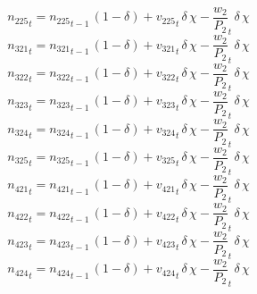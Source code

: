 \begin{dmath}
{{n_{225}}}_{t}={{n_{225}}}_{t-1}\, \left(1-{{\delta}}\right)+{{v_{225}}}_{t}\, {{\delta}}\, {{\chi}}-{{\frac{w_{2}}{P_{2}}}}_{t}\, {{\delta}}\, {{\chi}}
\end{dmath}
\begin{dmath}
{{n_{321}}}_{t}={{n_{321}}}_{t-1}\, \left(1-{{\delta}}\right)+{{v_{321}}}_{t}\, {{\delta}}\, {{\chi}}-{{\frac{w_{2}}{P_{2}}}}_{t}\, {{\delta}}\, {{\chi}}
\end{dmath}
\begin{dmath}
{{n_{322}}}_{t}={{n_{322}}}_{t-1}\, \left(1-{{\delta}}\right)+{{v_{322}}}_{t}\, {{\delta}}\, {{\chi}}-{{\frac{w_{2}}{P_{2}}}}_{t}\, {{\delta}}\, {{\chi}}
\end{dmath}
\begin{dmath}
{{n_{323}}}_{t}={{n_{323}}}_{t-1}\, \left(1-{{\delta}}\right)+{{v_{323}}}_{t}\, {{\delta}}\, {{\chi}}-{{\frac{w_{2}}{P_{2}}}}_{t}\, {{\delta}}\, {{\chi}}
\end{dmath}
\begin{dmath}
{{n_{324}}}_{t}={{n_{324}}}_{t-1}\, \left(1-{{\delta}}\right)+{{v_{324}}}_{t}\, {{\delta}}\, {{\chi}}-{{\frac{w_{2}}{P_{2}}}}_{t}\, {{\delta}}\, {{\chi}}
\end{dmath}
\begin{dmath}
{{n_{325}}}_{t}={{n_{325}}}_{t-1}\, \left(1-{{\delta}}\right)+{{v_{325}}}_{t}\, {{\delta}}\, {{\chi}}-{{\frac{w_{2}}{P_{2}}}}_{t}\, {{\delta}}\, {{\chi}}
\end{dmath}
\begin{dmath}
{{n_{421}}}_{t}={{n_{421}}}_{t-1}\, \left(1-{{\delta}}\right)+{{v_{421}}}_{t}\, {{\delta}}\, {{\chi}}-{{\frac{w_{2}}{P_{2}}}}_{t}\, {{\delta}}\, {{\chi}}
\end{dmath}
\begin{dmath}
{{n_{422}}}_{t}={{n_{422}}}_{t-1}\, \left(1-{{\delta}}\right)+{{v_{422}}}_{t}\, {{\delta}}\, {{\chi}}-{{\frac{w_{2}}{P_{2}}}}_{t}\, {{\delta}}\, {{\chi}}
\end{dmath}
\begin{dmath}
{{n_{423}}}_{t}={{n_{423}}}_{t-1}\, \left(1-{{\delta}}\right)+{{v_{423}}}_{t}\, {{\delta}}\, {{\chi}}-{{\frac{w_{2}}{P_{2}}}}_{t}\, {{\delta}}\, {{\chi}}
\end{dmath}
\begin{dmath}
{{n_{424}}}_{t}={{n_{424}}}_{t-1}\, \left(1-{{\delta}}\right)+{{v_{424}}}_{t}\, {{\delta}}\, {{\chi}}-{{\frac{w_{2}}{P_{2}}}}_{t}\, {{\delta}}\, {{\chi}}
\end{dmath}
